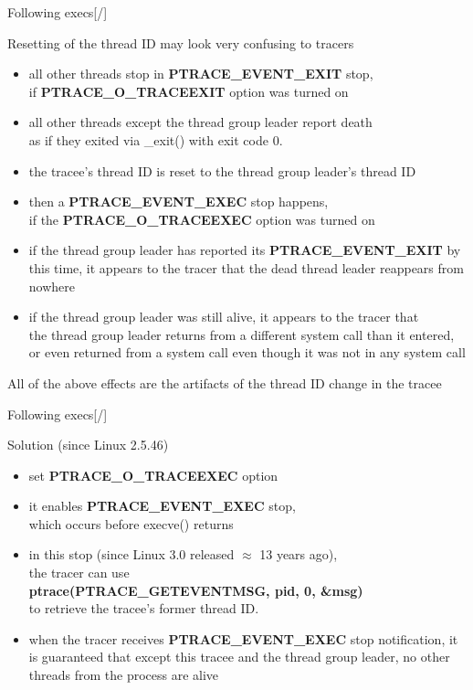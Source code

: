 \documentclass[unicode,aspectratio=169,xcolor={table,dvipsnames,usenames}]{beamer}
\begin{document}
\begin{frame}{\Large Following execs\hfill [\insertframenumber/\inserttotalframenumber]}
\begin{block}{Resetting of the thread ID may look very confusing to tracers}
\begin{itemize}
	\item all other threads stop in \textbf{PTRACE\_EVENT\_EXIT} stop, \\
		if \textbf{PTRACE\_O\_TRACEEXIT} option was turned on
	\item all other threads except the thread group leader report death \\
		as if they exited via \_exit() with exit code 0.
	\item the tracee's thread ID is reset to the thread group leader's thread ID
	\item then a \textbf{PTRACE\_EVENT\_EXEC} stop happens, \\
		if the \textbf{PTRACE\_O\_TRACEEXEC} option was turned on
	\item if the thread group leader has reported its \textbf{PTRACE\_EVENT\_EXIT} by this time,
		it appears to the tracer that the dead thread leader reappears from nowhere
	\item if the thread group leader was still alive, it appears to the tracer that \\
		the thread group leader returns from a different system call than it entered, \\
		or even returned from a system call even though it was not in any system call
\end{itemize}
\end{block}

All of the above effects are the artifacts of the thread ID change in the tracee
\end{frame}

\begin{frame}{\Large Following execs\hfill [\insertframenumber/\inserttotalframenumber]}
\Large
\begin{block}{Solution (since Linux 2.5.46)}
\begin{itemize}
	\item set \textbf{PTRACE\_O\_TRACEEXEC} option
	\item it enables \textbf{PTRACE\_EVENT\_EXEC} stop, \\
		which occurs before execve() returns
	\item in this stop (since Linux 3.0 released $\approx$ 13 years ago), \\
		the tracer can use \\
		\textbf{ptrace(PTRACE\_GETEVENTMSG, pid, 0, \&msg)} \\
		to retrieve the tracee's former thread ID.
	\item when the tracer receives \textbf{PTRACE\_EVENT\_EXEC} stop notification,
		it is guaranteed that except this tracee and the thread group leader,
		no other threads from the process are alive
\end{itemize}
\end{block}
\end{frame}
\end{document}
